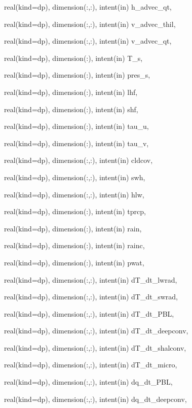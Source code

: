 {\begin{DoxyParamCaption}
\item[{real(kind=dp), dimension(\+:,\+:), intent(in)}]{h\+\_\+advec\+\_\+qt, }
\item[{real(kind=dp), dimension(\+:,\+:), intent(in)}]{v\+\_\+advec\+\_\+thil, }
\item[{real(kind=dp), dimension(\+:,\+:), intent(in)}]{v\+\_\+advec\+\_\+qt, }
\item[{real(kind=dp), dimension(\+:), intent(in)}]{T\+\_\+s, }
\item[{real(kind=dp), dimension(\+:), intent(in)}]{pres\+\_\+s, }
\item[{real(kind=dp), dimension(\+:), intent(in)}]{lhf, }
\item[{real(kind=dp), dimension(\+:), intent(in)}]{shf, }
\item[{real(kind=dp), dimension(\+:), intent(in)}]{tau\+\_\+u, }
\item[{real(kind=dp), dimension(\+:), intent(in)}]{tau\+\_\+v, }
\item[{real(kind=dp), dimension(\+:,\+:), intent(in)}]{cldcov, }
\item[{real(kind=dp), dimension(\+:,\+:), intent(in)}]{swh, }
\item[{real(kind=dp), dimension(\+:,\+:), intent(in)}]{hlw, }
\item[{real(kind=dp), dimension(\+:), intent(in)}]{tprcp, }
\item[{real(kind=dp), dimension(\+:), intent(in)}]{rain, }
\item[{real(kind=dp), dimension(\+:), intent(in)}]{rainc, }
\item[{real(kind=dp), dimension(\+:), intent(in)}]{pwat, }
\item[{real(kind=dp), dimension(\+:,\+:), intent(in)}]{d\+T\+\_\+dt\+\_\+lwrad, }
\item[{real(kind=dp), dimension(\+:,\+:), intent(in)}]{d\+T\+\_\+dt\+\_\+swrad, }
\item[{real(kind=dp), dimension(\+:,\+:), intent(in)}]{d\+T\+\_\+dt\+\_\+\+P\+BL, }
\item[{real(kind=dp), dimension(\+:,\+:), intent(in)}]{d\+T\+\_\+dt\+\_\+deepconv, }
\item[{real(kind=dp), dimension(\+:,\+:), intent(in)}]{d\+T\+\_\+dt\+\_\+shalconv, }
\item[{real(kind=dp), dimension(\+:,\+:), intent(in)}]{d\+T\+\_\+dt\+\_\+micro, }
\item[{real(kind=dp), dimension(\+:,\+:), intent(in)}]{dq\+\_\+dt\+\_\+\+P\+BL, }
\item[{real(kind=dp), dimension(\+:,\+:), intent(in)}]{dq\+\_\+dt\+\_\+deepconv, }

\end{DoxyParamCaption}}
